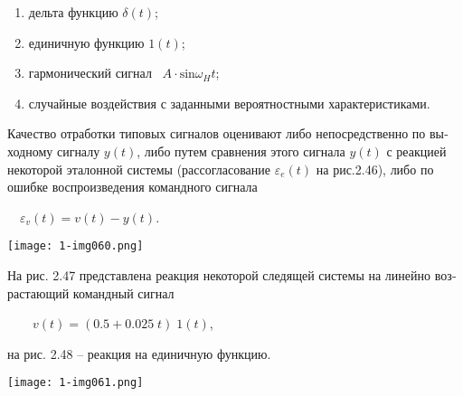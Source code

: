 \documentclass[a4paper]{article}
\newcommand\liststyleWWviiiNumlii{%
\renewcommand\theenumi{\arabic{enumi}}
\renewcommand\theenumii{\arabic{enumii}}
\renewcommand\theenumiii{\arabic{enumiii}}
\renewcommand\theenumiv{\arabic{enumiv}}
\renewcommand\labelenumi{\theenumi)}
\renewcommand\labelenumii{\theenumii.}
\renewcommand\labelenumiii{\theenumiii.}
\renewcommand\labelenumiv{\theenumiv.}
}
\begin{document}
\liststyleWWviiiNumlii
\begin{enumerate}
\item {\begin{russian}\sffamily
дельта функцию  $δ(t)$;
\end{russian}}
\item {\begin{russian}\sffamily
единичную функцию  $1(t)$;
\end{russian}}
\item {\begin{russian}\sffamily
гармонический сигнал \  $A\cdot \text{sin}ω_Ht$;
\end{russian}}
\item {\begin{russian}\sffamily
случайные воздействия с заданными вероятностными характеристиками.
\end{russian}}
\end{enumerate}
{\begin{russian}\sffamily
Качество отработки типовых сигналов оценивают либо непосредственно по выходному сигналу  $y(t)$, либо путем сравнения
этого сигнала  $y(t)$ с реакцией некоторой эталонной системы (рассогласование  $ε_e(t)$ на рис.2.46), либо по ошибке
воспроизведения командного сигнала
\end{russian}}

{\begin{russian}\sffamily
\ \  $ε_v(t)=v(t)-y(t)$.
\end{russian}}

{\centering  \texttt{[image: 1-img060.png]} \par}

\bigskip

{\begin{russian}\sffamily
На рис. 2.47 представлена реакция некоторой следящей системы на линейно возрастающий командный сигнал
\end{russian}}

{\begin{russian}\sffamily
\ \ \ \  $v(t)=(0.5+0.025\;t)\;1(t)$,
\end{russian}}

{\begin{russian}\sffamily
на рис. 2.48 – реакция на единичную функцию.
\end{russian}}

{\centering  \texttt{[image: 1-img061.png]} \par}
\end{document}
